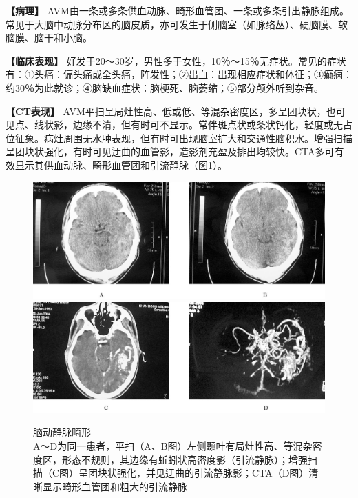 \textbf{【病理】}
AVM由一条或多条供血动脉、畸形血管团、一条或多条引出静脉组成。常见于大脑中动脉分布区的脑皮质，亦可发生于侧脑室（如脉络丛）、硬脑膜、软脑膜、脑干和小脑。

\textbf{【临床表现】}
好发于20～30岁，男性多于女性，10％～15％无症状。常见的症状有：①头痛：偏头痛或全头痛，阵发性；②出血：出现相应症状和体征；③癫痫：约30％为此就诊；④脑缺血症状：脑梗死、脑萎缩；⑤部分颅外听到杂音。

\textbf{【CT表现】}
AVM平扫呈局灶性高、低或低、等混杂密度区，多呈团块状，也可见点、线状影，边缘不清，但有时可不显示。常伴斑点状或条状钙化，轻度或无占位征象。病灶周围无水肿表现，但有时可出现脑室扩大和交通性脑积水。增强扫描呈团块状强化，有时可见迂曲的血管影，造影剂充盈及排出均较快。CTA多可有效显示其供血动脉、畸形血管团和引流静脉（图\ref{fig2-27}）。



\begin{figure}[!htbp]
 \centering
 \includegraphics[width=\textwidth,height=\textheight,keepaspectratio]{./images/Image00045.jpg}
 \includegraphics[width=\textwidth,height=\textheight,keepaspectratio]{./images/Image00046.jpg}
 \captionsetup{justification=centering}
 \caption{脑动静脉畸形\\{\small A～D为同一患者，平扫（A、B图）左侧颞叶有局灶性高、等混杂密度区，形态不规则，其边缘有蚯蚓状高密度影（引流静脉）；增强扫描（C图）呈团块状强化，并见迂曲的引流静脉影；CTA（D图）清晰显示畸形血管团和粗大的引流静脉}}
 \label{fig2-27}
  \end{figure} 

